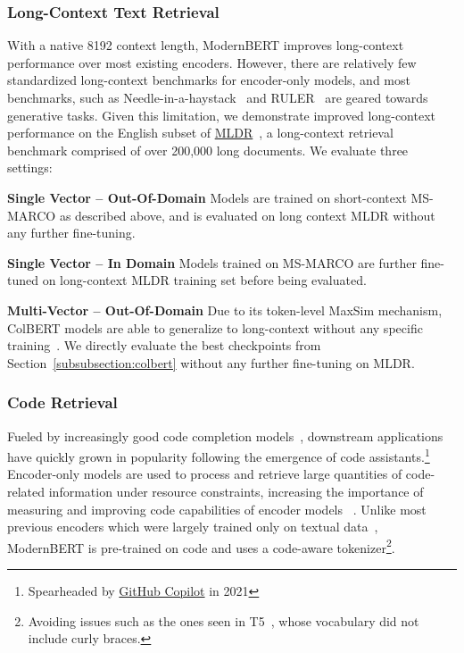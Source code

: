 \documentclass[11pt]{article}
\begin{document}
\subsubsection{Long-Context Text Retrieval}

With a native 8192 context length, ModernBERT improves long-context performance over most existing encoders. However, there are relatively few standardized long-context benchmarks for encoder-only models, and most benchmarks, such as Needle-in-a-haystack~\cite{niah} and RULER~\cite{ruler} are geared towards generative tasks. Given this limitation, we demonstrate improved long-context performance on the English subset of \href{https://huggingface.co/datasets/Shitao/MLDR}{MLDR}~\cite{DBLP:conf/acl/ChenXZLLL24}, a long-context retrieval benchmark comprised of over 200,000 long documents. We evaluate three settings:

\textbf{Single Vector -- Out-Of-Domain } Models are trained on short-context MS-MARCO as described above, and is evaluated on long context MLDR without any further fine-tuning.

\textbf{Single Vector -- In Domain} Models trained on MS-MARCO are further fine-tuned on long-context MLDR training set before being evaluated.

\textbf{Multi-Vector -- Out-Of-Domain} Due to its token-level MaxSim mechanism, ColBERT models are able to generalize to long-context without any specific training~\cite{vespalongcolbert}. We directly evaluate the best checkpoints from Section~\ref{subsubsection:colbert} without any further fine-tuning on MLDR.



\subsubsection{Code Retrieval}

Fueled by increasingly good code completion models~\cite{llmcodesurvey}, downstream applications have quickly grown in popularity following the emergence of code assistants.\footnote{Spearheaded by \href{https://github.com/features/copilot}{GitHub Copilot} in 2021} Encoder-only models are used to process and retrieve large quantities of code-related information under resource constraints, increasing the importance of measuring and improving code capabilities of encoder models ~\cite{coir}.  Unlike most previous encoders which were largely trained only on textual data~\cite{bert,roberta,mosaic,gte,nomic}, ModernBERT is pre-trained on code and uses a code-aware tokenizer\footnote{Avoiding issues such as the ones seen in T5~\cite{t5}, whose vocabulary did not include curly braces.}. 
\end{document}
